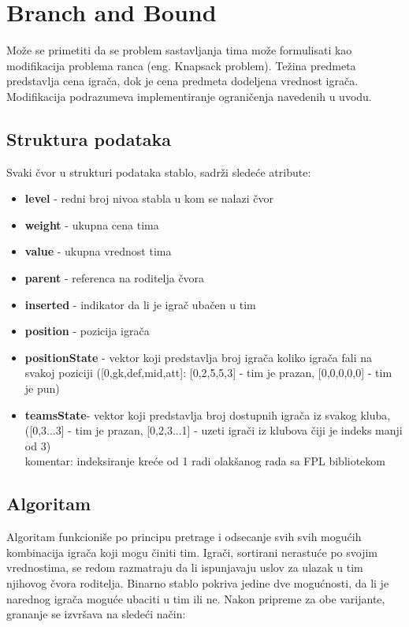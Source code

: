 \documentclass[a4paper]{article}
\begin{document}
\section{Branch and Bound}

\vspace{3mm} 
Može se primetiti da se problem sastavljanja tima može formulisati kao modifikacija problema ranca (eng. Knapsack problem). Težina predmeta predstavlja cena igrača, dok je cena predmeta dodeljena vrednost igrača. Modifikacija podrazumeva implementiranje ograničenja navedenih u uvodu.

\subsection{Struktura podataka}
\vspace{3mm} 
Svaki čvor u strukturi podataka stablo, sadrži sledeće atribute: \\
\begin{itemize}
	\item \textbf{level} - redni broj nivoa stabla u kom se nalazi čvor
	\item \textbf{weight} - ukupna cena tima
	\item \textbf{value} - ukupna vrednost tima
	\item \textbf{parent} - referenca na roditelja čvora
	\item \textbf{inserted} - indikator da li je igrač ubačen u tim
	\item \textbf{position} - pozicija igrača
	\item \textbf{positionState} - vektor koji predstavlja broj igrača koliko igrača fali na svakoj poziciji ([0,gk,def,mid,att]: [0,2,5,5,3] - tim je prazan, [0,0,0,0,0] - tim je pun)
	\item \textbf{teamsState}-  vektor koji predstavlja broj dostupnih igrača iz svakog kluba, ([0,3...3] - tim je prazan, [0,2,3...1] - uzeti igrači iz klubova čiji je indeks manji od 3) \\
	
	komentar: indeksiranje kreće od 1 radi olakšanog rada sa FPL bibliotekom

\end{itemize}

\subsection{Algoritam}
\vspace{3mm} 

Algoritam funkcioniše po principu pretrage i odsecanje svih svih mogućih kombinacija igrača koji mogu činiti tim. Igrači, sortirani nerastuće po svojim vrednostima, se redom razmatraju da li ispunjavaju uslov za ulazak u tim njihovog čvora roditelja. Binarno stablo pokriva jedine dve mogućnosti, da li je narednog igrača moguće ubaciti u tim ili ne. Nakon pripreme za obe varijante, grananje se izvršava na sledeći način: 
\end{document}
